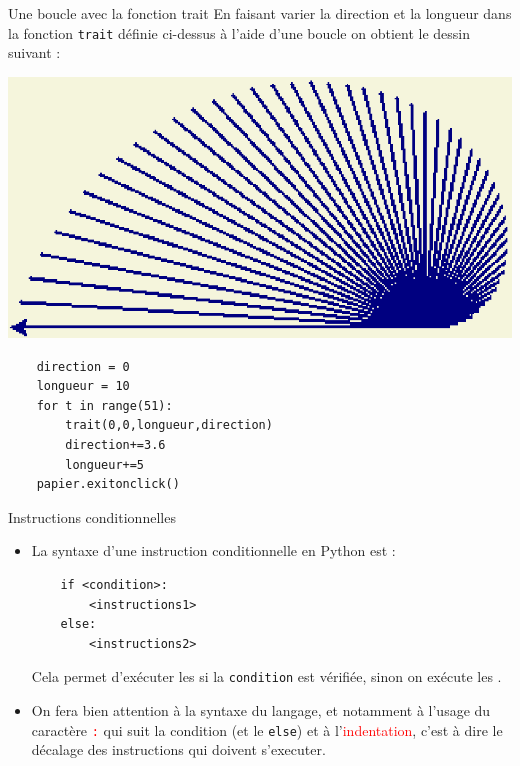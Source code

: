 \documentclass[10pt]{beamer}
\begin{document}
\begin{frame}[fragile]
	\mframe{\Python}
	\begin{exampleblock}{Une boucle avec la fonction trait}
		En faisant varier la direction et la longueur dans la fonction {\tt trait} définie ci-dessus à l'aide d'une boucle on obtient le dessin suivant :
		\begin{center}
			\includegraphics[scale=0.25]{ex-cours.eps}
		\end{center}
	\begin{lstlisting}
	direction = 0
	longueur = 10
	for t in range(51):
		trait(0,0,longueur,direction)
		direction+=3.6
		longueur+=5
	papier.exitonclick()
	\end{lstlisting}
	\end{exampleblock}
\end{frame}


\begin{frame}[fragile]
	\mframe{\Python}
	\begin{alertblock}{Instructions conditionnelles}
		\begin{itemize}
			\item<2-> La syntaxe d'une instruction conditionnelle en Python est :
			      \begin{lstlisting}
	if <condition>:
		<instructions1>
	else:
		<instructions2>
	\end{lstlisting}
			      Cela permet d'exécuter les {\tt <instructions1>} si la {\tt condition} est vérifiée, sinon on exécute les {\tt <instructions2>}.
			\item<3->  \textcolor{red}{\danger} On fera bien attention à la syntaxe du langage, et notamment à l'usage du caractère \textcolor{red}{\tt :} qui suit la condition (et le {\tt else}) et à l'\textcolor{red}{indentation}, c'est à dire le décalage des instructions qui doivent s'executer.
		\end{itemize}
	\end{alertblock}
\end{frame}
\end{document}
